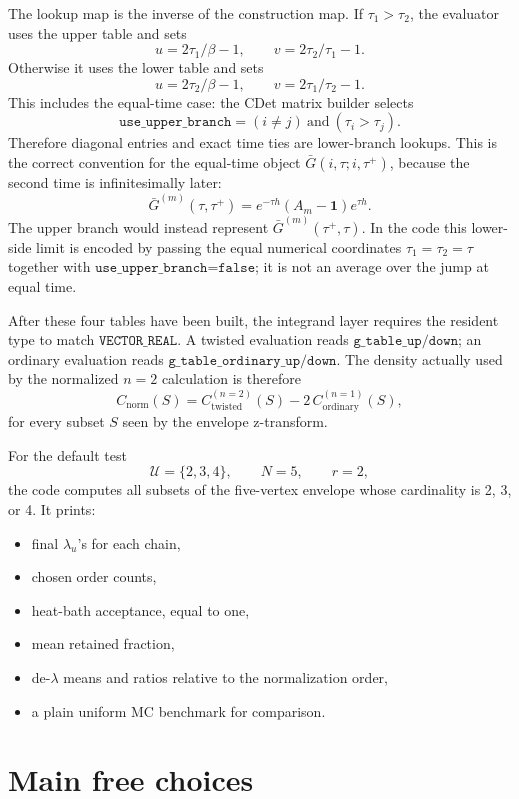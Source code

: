 \documentclass[11pt]{article}
\newcommand{\1}{\mathbf{1}}
\newcommand{\calU}{\mathcal{U}}
\begin{document}
The lookup map is the inverse of the construction map.  If
\(\tau_1>\tau_2\), the evaluator uses the upper table and sets
\[
  u=2\tau_1/\beta-1,\qquad v=2\tau_2/\tau_1-1.
\]
Otherwise it uses the lower table and sets
\[
  u=2\tau_2/\beta-1,\qquad v=2\tau_1/\tau_2-1.
\]
This includes the equal-time case: the CDet matrix builder selects
\[
  \texttt{use\_upper\_branch}
  =
  (i\neq j)\ \mathrm{and}\ (\tau_i>\tau_j).
\]
Therefore diagonal entries and exact time ties are lower-branch lookups.
This is the correct convention for the equal-time object
\(\bar G(i,\tau;i,\tau^+)\), because the second time is infinitesimally later:
\[
  \bar G^{(m)}(\tau,\tau^+)
  =
  e^{-\tau h}(A_m-\mathbf 1)e^{\tau h}.
\]
The upper branch would instead represent
\(\bar G^{(m)}(\tau^+,\tau)\).  In the code this lower-side limit is encoded by
passing the equal numerical coordinates
\(\tau_1=\tau_2=\tau\) together with
\(\texttt{use\_upper\_branch=false}\); it is not an average over the jump at
equal time.

After these four tables have been built, the integrand layer requires the
resident type to match \(\texttt{VECTOR\_REAL}\).  A twisted evaluation reads
\(\texttt{g\_table\_up/down}\); an ordinary evaluation reads
\(\texttt{g\_table\_ordinary\_up/down}\).  The density actually used by the
normalized \(n=2\) calculation is therefore
\[
  C_{\mathrm{norm}}(S)
  =
  C_{\mathrm{twisted}}^{(n=2)}(S)
  -
  2\,C_{\mathrm{ordinary}}^{(n=1)}(S),
\]
for every subset \(S\) seen by the envelope z-transform.

For the default test
\[
  \calU=\{2,3,4\},\qquad N=5,\qquad r=2,
\]
the code computes all subsets of the five-vertex envelope whose cardinality is
2, 3, or 4.  It prints:
\begin{itemize}[leftmargin=2em]
  \item final \(\lambda_u\)'s for each chain,
  \item chosen order counts,
  \item heat-bath acceptance, equal to one,
  \item mean retained fraction,
  \item de-\(\lambda\) means and ratios relative to the normalization order,
  \item a plain uniform MC benchmark for comparison.
\end{itemize}

\section{Main free choices}
\end{document}
